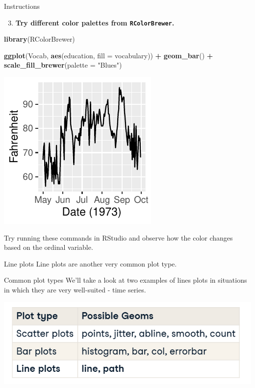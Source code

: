 \documentclass[
  ignorenonframetext,
]{beamer}
\newenvironment{Shaded}{\begin{snugshade}}{\end{snugshade}}
\newcommand{\AttributeTok}[1]{\textcolor[rgb]{0.13,0.29,0.53}{#1}}
\newcommand{\FunctionTok}[1]{\textcolor[rgb]{0.13,0.29,0.53}{\textbf{#1}}}
\newcommand{\NormalTok}[1]{#1}
\newcommand{\SpecialCharTok}[1]{\textcolor[rgb]{0.81,0.36,0.00}{\textbf{#1}}}
\newcommand{\StringTok}[1]{\textcolor[rgb]{0.31,0.60,0.02}{#1}}
\providecommand{\tightlist}{%
  \setlength{\itemsep}{0pt}\setlength{\parskip}{0pt}}
\begin{document}
\begin{frame}[fragile]{Instructions}
\label{instructions-10}
\begin{enumerate}
\setcounter{enumi}{2}
\tightlist
\item
  \textbf{Try different color palettes from \texttt{RColorBrewer}.}
\end{enumerate}

\begin{Shaded}
\begin{Highlighting}[]
\FunctionTok{library}\NormalTok{(RColorBrewer)}

\FunctionTok{ggplot}\NormalTok{(Vocab, }\FunctionTok{aes}\NormalTok{(education, }\AttributeTok{fill =}\NormalTok{ vocabulary)) }\SpecialCharTok{+} \FunctionTok{geom\_bar}\NormalTok{() }\SpecialCharTok{+}
    \FunctionTok{scale\_fill\_brewer}\NormalTok{(}\AttributeTok{palette =} \StringTok{"Blues"}\NormalTok{)}
\end{Highlighting}
\end{Shaded}

\begin{center}\includegraphics[width=0.5\linewidth]{Figs/unnamed-chunk-54-1} \end{center}

Try running these commands in RStudio and observe how the color changes
based on the ordinal variable.
\end{frame}

\begin{frame}{Line plots}
\label{line-plots}
Line plots are another very common plot type.
\end{frame}

\begin{frame}{Common plot types}
\label{common-plot-types-2}
We'll take a look at two examples of lines plots in situations in which
they are very well-suited - time series.

\includegraphics{../images/im210.png}
\end{frame}
\end{document}
